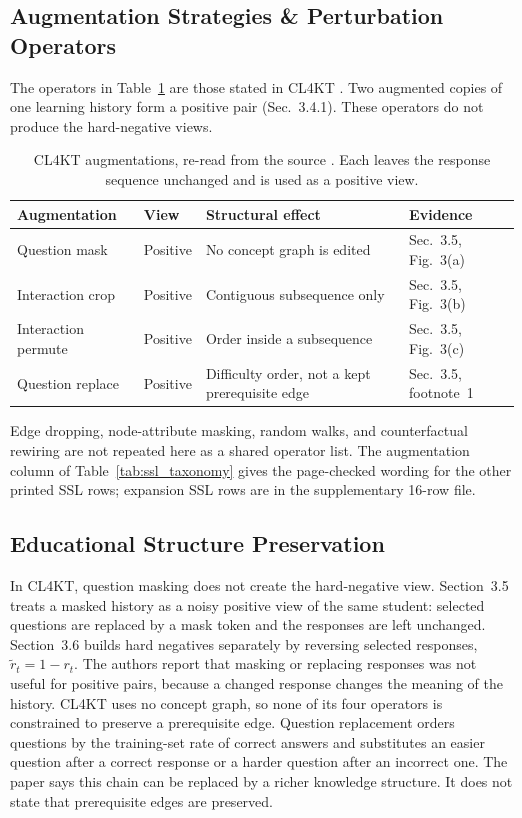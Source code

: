 \documentclass[lettersize,journal]{IEEEtran}
\begin{document}
\subsection{Augmentation Strategies \& Perturbation Operators}
The operators in Table~\ref{tab:cl4kt_aug} are those stated in CL4KT \cite{KT039_CL4KT_2022}. Two augmented copies of one learning history form a positive pair (Sec.~3.4.1). These operators do not produce the hard-negative views.
\begin{table}[t]
\caption{CL4KT augmentations, re-read from the source \cite{KT039_CL4KT_2022}. Each leaves the response sequence unchanged and is used as a positive view.}
\label{tab:cl4kt_aug}
\centering
\footnotesize
\setlength{\tabcolsep}{3pt}
\begin{tabular}{@{}p{1.55cm}p{1.15cm}p{1.15cm}p{3.3cm}@{}}
\toprule
\textbf{Augmentation} & \textbf{View} & \textbf{Structural effect} & \textbf{Evidence} \\
\midrule
Question mask & Positive & No concept graph is edited & Sec.~3.5, Fig.~3(a) \\
Interaction crop & Positive & Contiguous subsequence only & Sec.~3.5, Fig.~3(b) \\
Interaction permute & Positive & Order inside a subsequence & Sec.~3.5, Fig.~3(c) \\
Question replace & Positive & Difficulty order, not a kept prerequisite edge & Sec.~3.5, footnote~1 \\
\bottomrule
\end{tabular}
\end{table}
Edge dropping, node-attribute masking, random walks, and counterfactual rewiring are not repeated here as a shared operator list. The augmentation column of Table~\ref{tab:ssl_taxonomy} gives the page-checked wording for the other printed SSL rows; expansion SSL rows are in the supplementary 16-row file.

\subsection{Educational Structure Preservation}
In CL4KT, question masking does not create the hard-negative view. Section~3.5 treats a masked history as a noisy positive view of the same student: selected questions are replaced by a mask token and the responses are left unchanged. Section~3.6 builds hard negatives separately by reversing selected responses, $\tilde{r}_t = 1 - r_t$. The authors report that masking or replacing responses was not useful for positive pairs, because a changed response changes the meaning of the history. CL4KT uses no concept graph, so none of its four operators is constrained to preserve a prerequisite edge. Question replacement orders questions by the training-set rate of correct answers and substitutes an easier question after a correct response or a harder question after an incorrect one. The paper says this chain can be replaced by a richer knowledge structure. It does not state that prerequisite edges are preserved.
\end{document}
